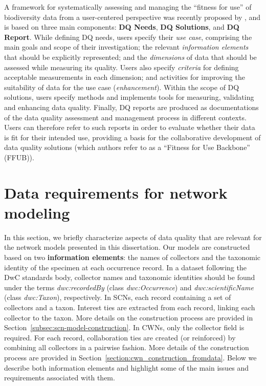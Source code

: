 A framework for systematically assessing and managing the ``fitness for use'' of biodiversity data from a user-centered perspective was recently proposed by , and is based on three main components: \textbf{DQ Needs}, \textbf{DQ Solutions}, and \textbf{DQ Report}.
%
While defining DQ needs, users specify their \textit{use case}, comprising the main goals and scope of their investigation; the relevant \textit{information elements} that should be explicitly represented; and the \textit{dimensions} of data that should be assessed while measuring its quality.
Users also specify \textit{criteria} for defining acceptable measurements in each dimension; and activities for improving the suitability of data for the use case (\textit{enhancement}).
%
Within the scope of DQ solutions, users specify methods and implements tools for measuring, validating and enhancing data quality.
%
Finally, DQ reports are produced as documentations of the data quality assessment and management process in different contexts.
Users can therefore refer to such reports in order to evaluate whether their data is fit for their intended use, providing a basis for the collaborative development of data quality solutions (which authors refer to as a ``Fitness for Use Backbone'' (FFUB)).

\section{Data requirements for network modeling} %
\label{section:datareq}
In this section, we briefly characterize aspects of data quality that are relevant for the network models presented in this dissertation.
Our models are constructed based on two \textbf{information elements}: the names of collectors and the taxonomic identity of the specimen at each occurrence record.
In a dataset following the DwC standards body, collector names and taxonomic identities should be found under the terms \textit{dwc:recordedBy} (class \textit{dwc:Occurrence}) and \textit{dwc:scientificName} (class \textit{dwc:Taxon}), respectively.
%
In SCNs, each record containing a set of collectors and a taxon. 
Interest ties are extracted from each record, linking each collector to the taxon.
More details on the construction process are provided in Section~\ref{subsec:scn-model-construction}.
%
In CWNs, only the collector field is required.
For each record, collaboration ties are created (or reinforced) by combining all collectors in a pairwise fashion.
More details of the construction process are provided in Section~\ref{section:cwn_construction_fromdata}.
%
Below we describe both information elements and highlight some of the main issues and requirements associated with them. 

